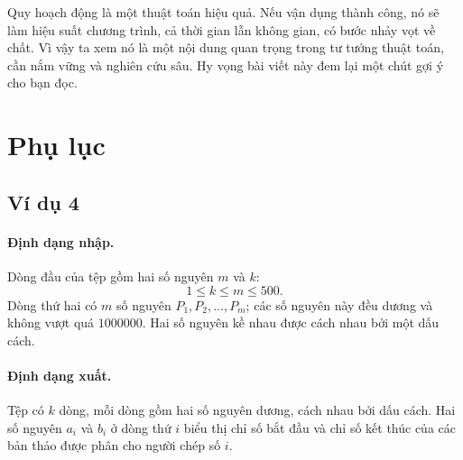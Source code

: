 \documentclass[11pt]{article}
\begin{document}
Quy hoạch động là một thuật toán hiệu quả. Nếu vận dụng thành công, nó sẽ làm
hiệu suất chương trình, cả thời gian lẫn không gian, có bước nhảy vọt về chất.
Vì vậy ta xem nó là một nội dung quan trọng trong tư tưởng thuật toán, cần nắm
vững và nghiên cứu sâu. Hy vọng bài viết này đem lại một chút gợi ý cho bạn
đọc.

\appendix
\section{Phụ lục}

\subsection*{Ví dụ 4}

\paragraph{Định dạng nhập.}
Dòng đầu của tệp gồm hai số nguyên $m$ và $k$:
\[
  1\le k\le m\le 500.
\]
Dòng thứ hai có $m$ số nguyên $P_1,P_2,\ldots,P_m$; các số nguyên này đều
dương và không vượt quá $1000000$. Hai số nguyên kề nhau được cách nhau bởi
một dấu cách.

\paragraph{Định dạng xuất.}
Tệp có $k$ dòng, mỗi dòng gồm hai số nguyên dương, cách nhau bởi dấu cách.
Hai số nguyên $a_i$ và $b_i$ ở dòng thứ $i$ biểu thị chỉ số bắt đầu và chỉ số
kết thúc của các bản thảo được phân cho người chép số $i$.
\end{document}
